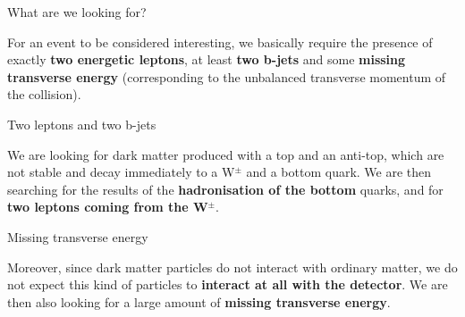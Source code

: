 \documentclass[handout,8 pt]{beamer}
\begin{document}
\begin{frame}{What are we looking for?}

	\justifying
	For an event to be considered interesting, we basically require the presence of exactly \textbf{two energetic leptons}, at least \textbf{two b-jets} and some \textbf{missing transverse energy} (corresponding to the unbalanced transverse momentum of the collision). \vspace{8pt}

	\begin{exampleblock}{} Two leptons and two b-jets \end{exampleblock} \vspace{8pt}

	\begin{minipage}[c]{.59\linewidth}
	\justifying
	We are looking for dark matter produced with a top and an anti-top, which are not stable and decay immediately to a W$^\pm$ and a bottom quark. We are then searching for the results of the \textbf{hadronisation of the bottom} quarks, and for \textbf{two leptons coming from the W$^\pm$}. \vfill
   	\end{minipage} \hfill
   	\begin{minipage}[c]{.39\linewidth}
	\end{minipage} \hfill \vfill
	
	\begin{exampleblock}{} Missing transverse energy \end{exampleblock}
	
	\vspace{8pt}
	\justifying
	Moreover, since dark matter particles do not interact with ordinary matter, we do not expect this kind of particles to \textbf{interact at all with the detector}. We are then also looking for a large amount of \textbf{missing transverse energy}. \vfill

\end{frame}
\end{document}
